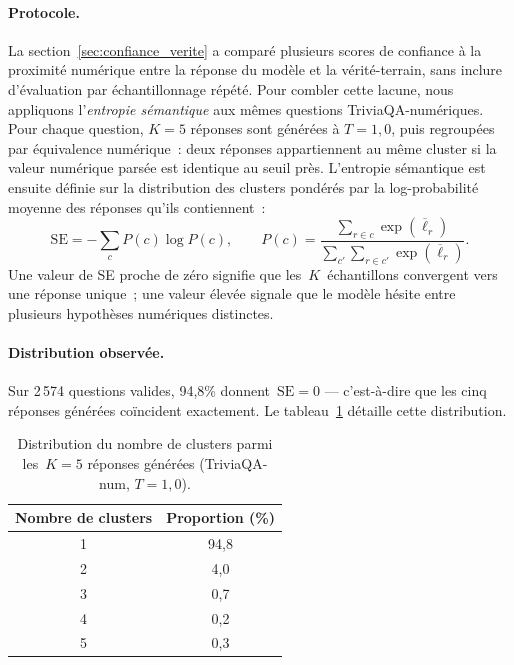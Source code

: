 \paragraph{Protocole.}
La section~\ref{sec:confiance_verite} a comparé plusieurs scores de confiance à
la proximité numérique entre la réponse du modèle et la vérité-terrain,
sans inclure d'évaluation par échantillonnage répété. Pour combler cette
lacune, nous appliquons l'\emph{entropie sémantique}
\citep{kuhn2023semantic} aux mêmes questions TriviaQA-numériques. Pour
chaque question, $K=5$ réponses sont générées à $T=1{,}0$, puis
regroupées par équivalence numérique~: deux réponses appartiennent au
même cluster si la valeur numérique parsée est identique au seuil
près. L'entropie sémantique est ensuite définie sur la distribution
des clusters pondérés par la log-probabilité moyenne des réponses qu'ils
contiennent~:
\begin{equation}
\mathrm{SE} = -\sum_{c} P(c) \log P(c),
\qquad
P(c) = \frac{\sum_{r \in c} \exp(\overline{\ell}_r)}
            {\sum_{c'} \sum_{r \in c'} \exp(\overline{\ell}_r)}.
\end{equation}
Une valeur de SE proche de zéro signifie que les~$K$~échantillons
convergent vers une réponse unique~; une valeur élevée signale que le
modèle hésite entre plusieurs hypothèses numériques distinctes.

\paragraph{Distribution observée.}
Sur 2\,574 questions valides, 94{,}8\% donnent~$\mathrm{SE} = 0$ —
c'est-à-dire que les cinq réponses générées coïncident exactement.
Le tableau~\ref{tab:se_clusters} détaille cette distribution.

\begin{table}[H]
\centering
\caption{Distribution du nombre de clusters parmi les~$K=5$ réponses
générées (TriviaQA-num, $T=1{,}0$).}
\label{tab:se_clusters}
\begin{tabular}{cc}
\toprule
Nombre de clusters & Proportion (\%) \\
\midrule
1 & 94{,}8 \\
2 & 4{,}0 \\
3 & 0{,}7 \\
4 & 0{,}2 \\
5 & 0{,}3 \\
\bottomrule
\end{tabular}
\end{table}

